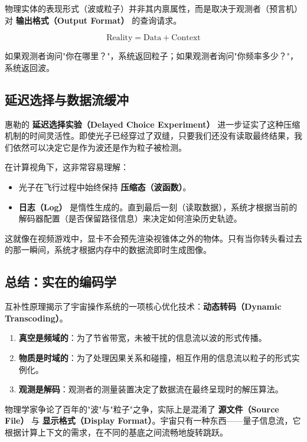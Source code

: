 \begin{theorem}[上下文依赖的实在性]
物理实体的表现形式（波或粒子）并非其内禀属性，而是取决于观测者（预言机）对 \textbf{输出格式（Output Format）} 的查询请求。

\begin{equation}
\text{Reality} = \text{Data} + \text{Context}
\end{equation}

如果观测者询问"你在哪里？"，系统返回粒子；如果观测者询问"你频率多少？"，系统返回波。
\end{theorem}

\subsection{延迟选择与数据流缓冲}

惠勒的 \textbf{延迟选择实验（Delayed Choice Experiment）} 进一步证实了这种压缩机制的时间灵活性。即使光子已经穿过了双缝，只要我们还没有读取最终结果，我们依然可以决定它是作为波还是作为粒子被检测。

在计算视角下，这非常容易理解：

\begin{itemize}
\item 光子在飞行过程中始终保持 \textbf{压缩态（波函数）}。

\item \textbf{日志（Log）} 是惰性生成的。直到最后一刻（读取数据），系统才根据当前的解码器配置（是否保留路径信息）来决定如何渲染历史轨迹。
\end{itemize}

这就像在视频游戏中，显卡不会预先渲染视锥体之外的物体。只有当你转头看过去的那一瞬间，系统才根据内存中的数据流即时生成图像。

\subsection{总结：实在的编码学}

互补性原理揭示了宇宙操作系统的一项核心优化技术：\textbf{动态转码（Dynamic Transcoding）}。

\begin{enumerate}
\item \textbf{真空是频域的}：为了节省带宽，未被干扰的信息流以波的形式传播。

\item \textbf{物质是时域的}：为了处理因果关系和碰撞，相互作用的信息流以粒子的形式实例化。

\item \textbf{观测是解码}：观测者的测量装置决定了数据流在最终呈现时的解压算法。
\end{enumerate}

物理学家争论了百年的"波"与"粒子"之争，实际上是混淆了 \textbf{源文件（Source File）} 与 \textbf{显示格式（Display Format）}。宇宙只有一种东西——量子信息流，它根据计算上下文的需求，在不同的基底之间流畅地旋转跳跃。
